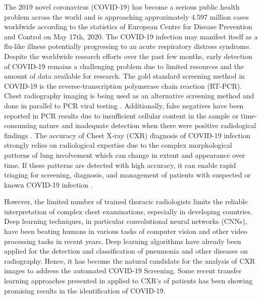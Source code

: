  The 2019 novel coronavirus (COVID-19) has become a serious public health problem across the world and is approaching approximately 4.597 million cases worldwide according to the statistics of European Centre for Disease Prevention and Control on May 17th, 2020. The COVID-19 infection may manifest itself as a flu-like illness potentially progressing to an acute respiratory distress syndrome. Despite the worldwide research efforts over the past few months, early detection of COVID-19 remains a challenging problem due to limited resources and the amount of data available for research. The gold standard screening method in COVID-19 is the reverse-transcription polymerase chain reaction (RT-PCR). Chest radiography imaging is being used as an alternative screening method and done in parallel to PCR viral testing  \cite{wang2020covid}.  Additionally, false negatives have been reported in PCR results due to insufficient cellular content in the sample or time-consuming nature and inadequate detection when there were positive radiological findings \cite{araujo2020covid}. The accuracy of Chest X-ray (CXR) diagnosis of COVID-19 infection strongly relies on radiological expertise due to the complex morphological patterns of lung involvement which can change in extent and appearance over time. If these patterns are detected with high accuracy, it can enable rapid triaging for
screening, diagnosis, and management of patients with suspected or known COVID-19 infection \cite{luz2020efficient}.

However, the limited number of trained thoracic radiologists limits the reliable interpretation of complex chest examinations, especially in developing countries. Deep learning techniques, in particular convolutional neural networks (CNNs), have been beating humans in various tasks of computer vision and other video processing tasks in recent years. Deep learning algorithms have already been applied for the detection and classification of pneumonia \cite{rajpurkar2017chexnet, zech2018variable} and other diseases on radiography. Hence, it has become the natural candidate for the analysis of CXR images to address the automated COVID-19 Screening. Some recent transfer learning approaches presented in \cite{chowdhury2020can, wang2020covid, butt2020deep, farooq2020covid, luz2020efficient} applied to CXR's of patients has been showing promising results in the identification of COVID-19. 
 
